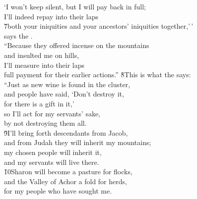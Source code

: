 \begin{poetry}
\poemll    `I won't keep silent, but I will pay back in full; \\
\poemlll       I'll indeed repay into their laps \\
\poeml \v{7}both your iniquities and your ancestors' iniquities together,'\,' \\
\poemll    says the . \\
\poeml ``Because they offered incense on the mountains \\
\poemll    and insulted me on hills, \\
\poeml I'll measure into their laps \\
\poemll    full payment for their earlier actions.''
\poeml \v{8}This is what the  says: \\
\poemll    ``Just as new wine is found in the cluster, \\
\poeml and people have said, `Don't destroy it, \\
\poemll    for there is a gift in it,' \\
\poeml so I'll act for my servants' sake, \\
\poemll    by not destroying them all. \\
\poeml \v{9}I'll bring forth descendants from Jacob, \\
\poemll    and from Judah they will inherit my mountains; \\
\poeml my chosen people will inherit it, \\
\poemll    and my servants will live there. \\
\poeml \v{10}Sharon will become a pasture for flocks, \\
\poemll    and the Valley of Achor a fold for herds, \\
\poemlll       for my people who have sought me. \\

\end{poetry}
